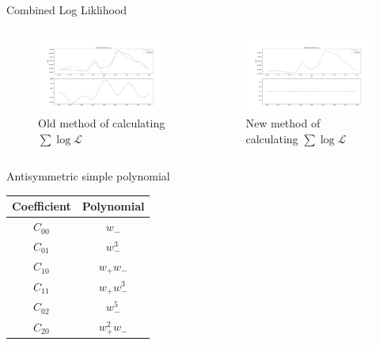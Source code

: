 \begin{frame}{Combined Log Liklihood}
\begin{columns}
\begin{column}{0.5\textwidth}
\begin{figure}
\includegraphics[width=\textwidth]{2020_05_19/combLL_test/old00/00.png}
\caption{Old method of calculating $\sum \log \mathcal{L}$}
\end{figure}
\hfill
\end{column}
\begin{column}{0.5\textwidth}
\begin{figure}
\includegraphics[width=\textwidth]{2020_05_19/combLL_test/new00/00.png}
\caption{New method of calculating $\sum \log \mathcal{L}$}
\end{figure}
\hfill
\end{column}
\end{columns}
\end{frame}

\begin{frame}{Antisymmetric simple polynomial}
\begin{center}
\begin{tabular}{|c|c|}
Coefficient & Polynomial \\ \hline
$C_{00}$ & $w_-$ \\
$C_{01}$ & $w_-^3$ \\
$C_{10}$ & $w_+ w_-$ \\
$C_{11}$ & $w_+ w_-^3$ \\
$C_{02}$ & $w_-^5$ \\
$C_{20}$ & $w_+^2 w_-$ \\ 
\end{tabular}
\end{center}
\end{frame}

